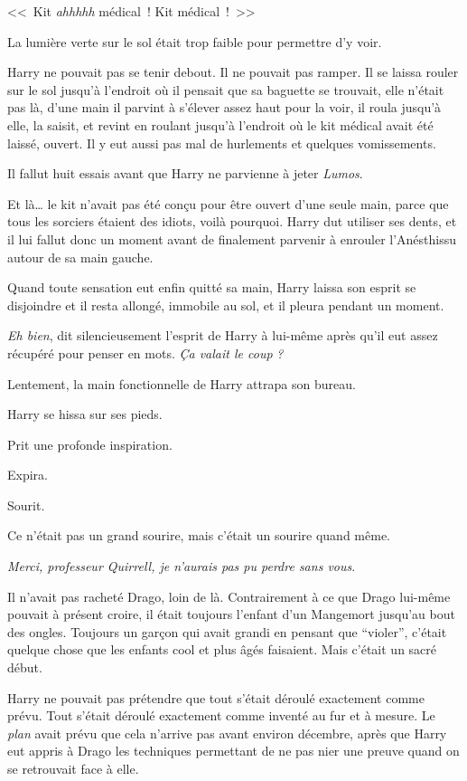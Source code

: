 <<~Kit \emph{ahhhhh} médical~! Kit médical~!~>>

La lumière verte sur le sol était trop faible pour permettre d'y voir.

Harry ne pouvait pas se tenir debout. Il ne pouvait pas ramper. Il se laissa rouler sur le sol jusqu'à l'endroit où il pensait que sa baguette se trouvait, elle n'était pas là, d'une main il parvint à s'élever assez haut pour la voir, il roula jusqu'à elle, la saisit, et revint en roulant jusqu'à l'endroit où le kit médical avait été laissé, ouvert. Il y eut aussi pas mal de hurlements et quelques vomissements.

Il fallut huit essais avant que Harry ne parvienne à jeter \emph{Lumos}.

Et là… le kit n'avait pas été conçu pour être ouvert d'une seule main, parce que tous les sorciers étaient des idiots, voilà pourquoi. Harry dut utiliser ses dents, et il lui fallut donc un moment avant de finalement parvenir à enrouler l'Anésthissu autour de sa main gauche.

Quand toute sensation eut enfin quitté sa main, Harry laissa son esprit se disjoindre et il resta allongé, immobile au sol, et il pleura pendant un moment.

\emph{Eh bien}, dit silencieusement l'esprit de Harry à lui-même après qu'il eut assez récupéré pour penser en mots. \emph{Ça valait le coup} \emph{?}

Lentement, la main fonctionnelle de Harry attrapa son bureau.

Harry se hissa sur ses pieds.

Prit une profonde inspiration.

Expira.

Sourit.

Ce n'était pas un grand sourire, mais c'était un sourire quand même.

\emph{Merci, professeur Quirrell, je n'aurais pas pu perdre sans vous}.

Il n'avait pas racheté Drago, loin de là. Contrairement à ce que Drago lui-même pouvait à présent croire, il était toujours l'enfant d'un Mangemort jusqu'au bout des ongles. Toujours un garçon qui avait grandi en pensant que “violer”, c'était quelque chose que les enfants cool et plus âgés faisaient. Mais c'était un sacré début.

Harry ne pouvait pas prétendre que tout s'était déroulé exactement comme prévu. Tout s'était déroulé exactement comme inventé au fur et à mesure. Le \emph{plan} avait prévu que cela n'arrive pas avant environ décembre, après que Harry eut appris à Drago les techniques permettant de ne pas nier une preuve quand on se retrouvait face à elle.

